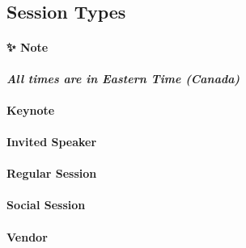 \documentclass[
]{book}
\begin{document}
\hypertarget{session-types-3}{%
\subsection*{Session Types}\label{session-types-3}}

\begin{protip}
\hypertarget{note}{%
\paragraph*{✨ Note}\label{note}}

\textbf{\emph{All times are in Eastern Time (Canada)}}
\end{protip}

\begin{keynote}
\hypertarget{keynote}{%
\paragraph{Keynote}\label{keynote}}
\end{keynote}

\begin{speaker}
\hypertarget{invited-speaker}{%
\paragraph{Invited Speaker}\label{invited-speaker}}
\end{speaker}

\begin{session}
\hypertarget{regular-session}{%
\paragraph{Regular Session}\label{regular-session}}
\end{session}

\begin{social}
\hypertarget{social-session}{%
\paragraph{Social Session}\label{social-session}}
\end{social}

\begin{vendor}
\hypertarget{vendor}{%
\paragraph{Vendor}\label{vendor}}
\end{vendor}
\end{document}
